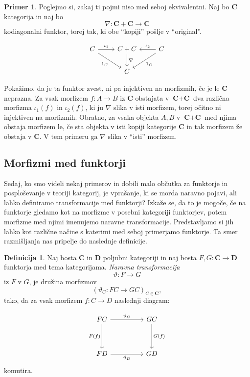 \documentclass[12pt,a4paper]{book}
\theoremstyle{definition}
\newtheorem{definicija}{Definicija}[chapter]
\theoremstyle{plain}
\theoremstyle{definition}
\newtheorem{primer}{Primer}[section]
\theoremstyle{remark}
\newcommand{\cat}[1]{\textbf{#1}}
\begin{document}
\begin{primer}
Poglejmo si, zakaj ti pojmi niso med seboj ekvivalentni. Naj bo $\cat{C}$ kategorija in naj bo 
$$\nabla : \cat{C} + \cat{C} \to \cat{C}$$ 
kodiagonalni funktor, torej tak, ki obe "`kopiji"' pošlje v "`original"'.

$$\begin{tikzcd}[column sep=normal]
C \ar[r, "\iota_1"] \ar[dr, "1_C"'] & C + C \ar[d, "\nabla"] & C \ar[l, "\iota_2"'] \ar[dl, "1_C"] \\
& C &
\end{tikzcd}$$

Pokažimo, da je ta funktor zvest, ni pa injektiven na morfizmih, če je le $\cat{C}$ neprazna. 
Za vsak morfizem $f : A \to B$ iz $\cat{C}$ obstajata v $\cat{C} + \cat{C}$ dva različna morfizma $\iota_1(f)$ in $\iota_2(f)$, ki ju $\nabla$ slika v isti morfizem, torej očitno ni injektiven na morfizmih. Obratno, za vsaka objekta $A,B$ v $\cat{C} + \cat{C}$ med njima obstaja morfizem le, če sta objekta v isti kopiji kategorije $\cat{C}$ in tak morfizem že obstaja v $\cat{C}$. V tem primeru ga $\nabla$ slika v "`isti"' morfizem.

\end{primer}

\subsection{Morfizmi med funktorji}
Sedaj, ko smo videli nekaj primerov in dobili malo občutka za funktorje in posploševanje v teoriji kategorij, je vprašanje, ki se morda naravno pojavi, ali lahko definiramo transformacije med funktorji? Izkaže se, da to je mogoče, če na funktorje gledamo kot na morfizme v posebni kategoriji funktorjev, potem morfizme med njimi imenujemo naravne transformacije. Predstavljamo si jih lahko kot različne načine s katerimi med seboj primerjamo funktorje. Ta smer razmišljanja nas pripelje do naslednje definicije.

\begin{definicija}
Naj bosta $\cat{C}$ in $\cat{D}$ poljubni kategoriji in naj bosta $F,G : \cat{C} \to \cat{D}$ funktorja med tema kategorijama.
\emph{Naravna transformacija} 
$$\vartheta : F \to G$$
iz $F$ v $G$, je družina morfizmov
$$(\vartheta_C : FC \to GC)_{C \in \cat{C}},$$
tako, da za vsak morfizem $f : C \to D$ naslednji diagram:

\begin{equation}
\begin{tikzcd}[sep=huge]
FC \arrow[r, "\vartheta_C"] \arrow[d, "F(f)"'] & GC \arrow[d, "G(f)"] \\
FD \arrow[r, "\vartheta_D"'] & GD
\end{tikzcd}
\end{equation}
komutira.
\end{definicija}
\end{document}

